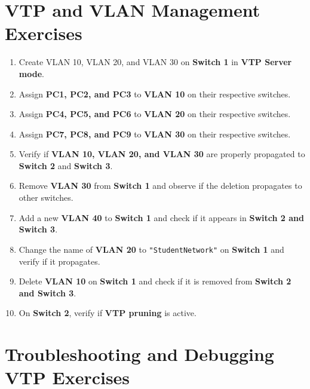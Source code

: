 \documentclass[a4paper]{book}
\begin{document}
\newpage

\section{VTP and VLAN Management Exercises}

\begin{enumerate}
    \item Create VLAN 10, VLAN 20, and VLAN 30 on \textbf{Switch 1} in \textbf{VTP Server mode}.
    \item Assign \textbf{PC1, PC2, and PC3} to \textbf{VLAN 10} on their respective switches.
    \item Assign \textbf{PC4, PC5, and PC6} to \textbf{VLAN 20} on their respective switches.
    \item Assign \textbf{PC7, PC8, and PC9} to \textbf{VLAN 30} on their respective switches.
    \item Verify if \textbf{VLAN 10, VLAN 20, and VLAN 30} are properly propagated to \textbf{Switch 2} and \textbf{Switch 3}.
    \item Remove \textbf{VLAN 30} from \textbf{Switch 1} and observe if the deletion propagates to other switches.
    \item Add a new \textbf{VLAN 40} to \textbf{Switch 1} and check if it appears in \textbf{Switch 2 and Switch 3}.
    \item Change the name of \textbf{VLAN 20} to \texttt{"StudentNetwork"} on \textbf{Switch 1} and verify if it propagates.
    \item Delete \textbf{VLAN 10} on \textbf{Switch 1} and check if it is removed from \textbf{Switch 2 and Switch 3}.
    \item On \textbf{Switch 2}, verify if \textbf{VTP pruning} is active.
\end{enumerate}
\newpage

\section{Troubleshooting and Debugging VTP Exercises}
\end{document}
